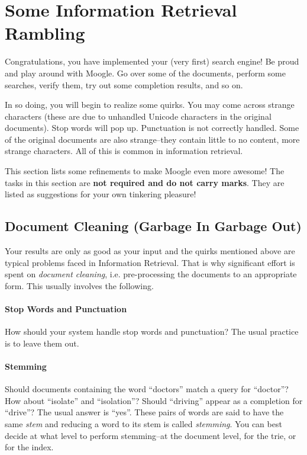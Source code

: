 \documentclass[addpoints]{exam}
\begin{document}
\section{Some Information Retrieval Rambling}
\label{sec:refine}

Congratulations, you have implemented your (very first) search engine! Be proud and play around with Moogle. Go over some of the documents, perform some searches, verify them, try out some completion results, and so on.

In so doing, you will begin to realize some quirks. You may come across strange characters (these are due to unhandled Unicode characters in the original documents). Stop words will pop up. Punctuation is not correctly handled. Some of the original documents are also strange--they contain little to no content, more strange characters. All of this is common in information retrieval.

This section lists some refinements to make Moogle even more awesome! The tasks in this section are \textbf{not required and do not carry marks}. They are listed as suggestions for your own tinkering pleasure!

\subsection{Document Cleaning (Garbage In Garbage Out)}

Your results are only as good as your input and the quirks mentioned above are typical problems faced in Information Retrieval. That is why significant effort is spent on \textit{document cleaning}, i.e. pre-processing the documents to an appropriate form. This usually involves the following.

\paragraph{Stop Words and Punctuation} How should your system handle stop words and punctuation? The usual practice is to leave them out.

\paragraph{Stemming} Should documents containing the word ``doctors'' match a query for ``doctor''? How about ``isolate'' and ``isolation''? Should ``driving'' appear as a completion for ``drive''? The usual answer is ``yes''. These pairs of words are said to have the same \textit{stem} and reducing a word to its stem is called \textit{stemming}. You can best decide at what level to perform stemming--at the document level, for the trie, or for the index.
\end{document}
